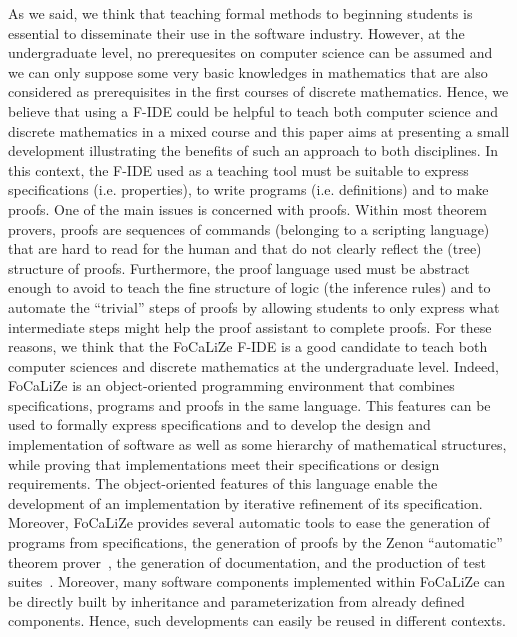 \documentclass[submission,copyright,creativecommons]{eptcs}
\def\focalize{FoCaLiZe \mbox{}}
\begin{document}
As we said, we think that teaching formal methods to beginning
students
is essential to disseminate their use in the software industry. However, at
the undergraduate level, no prerequesites on computer science can be
assumed and we can only suppose some very basic knowledges in
mathematics that are also considered as prerequisites in the first
courses of discrete mathematics. Hence, we believe that using a F-IDE
could be helpful to teach both computer science and discrete
mathematics in a mixed course and this paper aims at presenting a
small development illustrating the benefits of such an approach to
both disciplines. In this context, the F-IDE used as a teaching tool
must be suitable to express specifications
(i.e. properties), to write programs (i.e. definitions) and to make
proofs. One of the main issues is concerned with proofs. Within most theorem
provers, proofs are sequences of commands (belonging to a scripting
language)  that are hard to read for the
human and that do not clearly reflect the (tree) structure of 
proofs. Furthermore, the proof language used must be abstract enough
to avoid to teach the fine structure of logic (the inference rules)
and to automate the ``trivial'' steps of proofs by allowing students
to only express what intermediate steps
might help the proof assistant to complete proofs.
For these reasons, we think that  the \focalize\cite{foc03} F-IDE is a good candidate
to teach both computer sciences and discrete mathematics at the
undergraduate level.
Indeed, \focalize is an object-oriented programming environment that
combines specifications, programs and proofs in the same language. This
features can be used to
formally express specifications and to develop
the design and implementation of software as well as some hierarchy of
mathematical structures,
while proving that implementations meet their specifications or design
requirements.  
The object-oriented
features of this language enable the development of an implementation
by iterative refinement of its specification. Moreover, \focalize
provides several automatic tools to ease the generation of programs
from specifications, the generation of
proofs by the Zenon ``automatic'' theorem prover~\cite{conf/lpar/BonichonDD07}, the generation of
documentation, and the production of
test suites~\cite{DBLP:conf/icsoft/CarlierDG10}.
Moreover, many software
components implemented within \focalize can be directly built by
inheritance and parameterization from already defined components.
Hence, such developments can easily be reused in different contexts.
\end{document}
